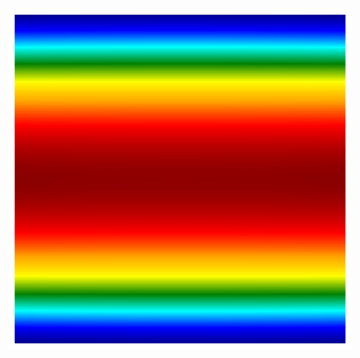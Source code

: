 \documentclass{beamer}
\begin{document}
\begin{frame}
\begin{columns}[T]
\begin{column}{0.31\textwidth}
{{\begin{minipage}{1.2\linewidth}
\begin{minipage}{0.6\linewidth}
\begin{figure}[h!]
{\begin{minipage}{\textwidth}
\begin{subfigure}[b]{0.45\linewidth}
											\includegraphics[width=\linewidth]{figs/FFFF2.png}
											\caption{}
										\end{subfigure}
										
										\vspace{0.8em}
										

\end{minipage}}
\end{figure}
\end{minipage}
\end{minipage}}}
\end{column}
\end{columns}
\end{frame}
\end{document}
